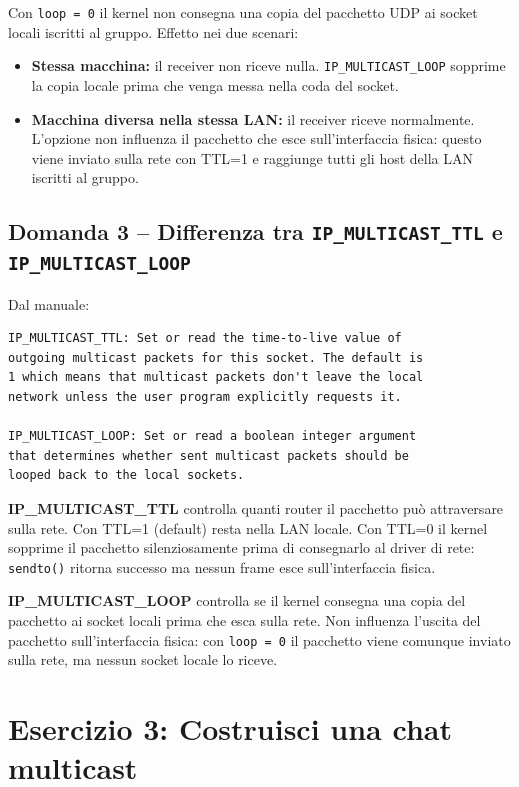 \documentclass[a4paper,12pt]{article}
\begin{document}
Con \texttt{loop = 0} il kernel non consegna una copia del pacchetto UDP ai socket
locali iscritti al gruppo. Effetto nei due scenari:

\begin{itemize}
  \item \textbf{Stessa macchina:} il receiver non riceve nulla. \texttt{IP\_MULTICAST\_LOOP}
        sopprime la copia locale prima che venga messa nella coda del socket.
  \item \textbf{Macchina diversa nella stessa LAN:} il receiver riceve normalmente.
        L'opzione non influenza il pacchetto che esce sull'interfaccia fisica: questo
        viene inviato sulla rete con TTL=1 e raggiunge tutti gli host della LAN
        iscritti al gruppo.
\end{itemize}

\subsection*{Domanda 3 -- Differenza tra \texttt{IP\_MULTICAST\_TTL} e
\texttt{IP\_MULTICAST\_LOOP}}

Dal manuale:

\begin{verbatim}
IP_MULTICAST_TTL: Set or read the time-to-live value of
outgoing multicast packets for this socket. The default is
1 which means that multicast packets don't leave the local
network unless the user program explicitly requests it.

IP_MULTICAST_LOOP: Set or read a boolean integer argument
that determines whether sent multicast packets should be
looped back to the local sockets.
\end{verbatim}

\textbf{IP\_MULTICAST\_TTL} controlla quanti router il pacchetto può attraversare
sulla rete. Con TTL=1 (default) resta nella LAN locale. Con TTL=0 il kernel sopprime
il pacchetto silenziosamente prima di consegnarlo al driver di rete: \texttt{sendto()} ritorna
successo ma nessun frame esce sull'interfaccia fisica.

\textbf{IP\_MULTICAST\_LOOP} controlla se il kernel consegna una copia del pacchetto
ai socket locali prima che esca sulla rete. Non influenza l'uscita del pacchetto
sull'interfaccia fisica: con \texttt{loop = 0} il pacchetto viene comunque inviato
sulla rete, ma nessun socket locale lo riceve.

\section{Esercizio 3: Costruisci una chat multicast}
\end{document}
